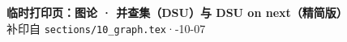 \documentclass{article}
\begin{document}
	\begin{center}
		{\Large \textbf{临时打印页：图论 · 并查集（DSU）与 DSU on next（精简版）}} \\[4pt]
		{\small 补印自 \texttt{sections/10\_graph.tex}\quad·-10-07}
	\end{center}

	\vspace{0.5em}

	
\end{document}
